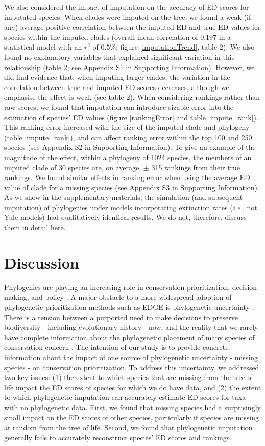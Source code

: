 \documentclass[10pt,english]{article}
\begin{document}
We also considered the impact of imputation on the accuracy of ED scores for
imputated species. When clades were imputed on the tree, we found a weak (if
any) average positive correlation between the imputed ED and true ED values for
species within the imputed clades (overall mean correlation of $0.197$ in a
statistical model with an $r^2$ of $0.5\%$; figure \ref{imputationTrend}, table
2). We also found no explanatory variables that explained significant variation
in this relationship (table 2; see Appendix S1 in Supporting Information).
However, we did find evidence that, when imputing larger clades, the variation
in the correlation between true and imputed ED scores decreases, although we
emphasise the effect is weak (see table 2). When considering rankings rather
than raw scores, we found that imputation can introduce sizable error into the
estimation of species' ED values (figure \ref{rankingError} and table
\ref{impute_rank}). This ranking error increased with the size of the imputed
clade and phylogeny (table \ref{impute_rank}), and can affect ranking error
within the top 100 and 250 species (see Appendix S2 in Supporting Information).
To give an example of the magnitude of the effect, within a phylogeny of 1024
species, the members of an imputed clade of 30 species are, on average, $\pm$
315 rankings from their true rankings. We found similar effects in ranking error
when using the average ED value of clade for a missing species (see Appendix S3
in Supporting Information). As we show in the supplementary materials, the
simulation (and subsequent imputation) of phylogenies under models incorporating
extinction rates (\emph{i.e.}, not Yule models) had qualitatively identical
results. We do not, therefore, discuss them in detail here.

\section*{Discussion}
Phylogenies are playing an increasing role in conservation prioritization,
decision-making, and policy \autocite{Vezquez1998, Veron2017}. A major obstacle
to a more widespread adoption of phylogenetic prioritization methods such as
EDGE is phylogenetic uncertainty \autocite{Collen2015}. There is a tension
between a purported need to make decisions to preserve biodiversity---including
evolutionary history---now, and the reality that we rarely have complete
information about the phylogenetic placement of many species of conservation
concern \autocite{Isaac2018}. The intention of our study is to
provide concrete information about the impact of one source of phylogenetic
uncertainty - missing species - on conservation prioritization. To address this
uncertainty, we addressed two key issues: (1) the extent to which species that
are missing from the tree of life impact the ED scores of species for which we
do have data, and (2) the extent to which phylogenetic imputation can accurately
estimate ED scores for taxa with no phylogenetic data. First, we found that
missing species had a surprisingly small impact on the ED scores of other
species, particularly if species are missing at random from the tree of life.
Second, we found that phylogenetic imputation generally fails to accurately
reconstruct species' ED scores and rankings.
\end{document}
